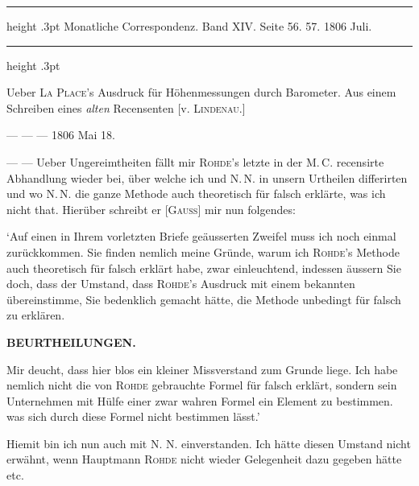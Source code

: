 \par\bigskip
{}
\hypertarget{native-490-lower}{}
\label{native-490-lower}
\begin{center}
\parbox{.70\linewidth}{%
\centering\small
\hrule height .3pt\relax\vspace{2.5pt}
Monatliche Correspondenz. Band XIV. Seite 56. 57. 1806 Juli.\par
\vspace{2.5pt}\hrule height .3pt\relax
}
\end{center}

\begin{center}
Ueber \textsc{La Place}'s Ausdruck für Höhenmessungen durch Barometer. Aus einem Schreiben eines \emph{alten} Recensenten [v. \textsc{Lindenau}.]
\end{center}

\begin{flushright}
--- --- --- 1806 Mai 18.
\end{flushright}

--- --- Ueber Ungereimtheiten fällt mir \textsc{Rohde}'s letzte in der M.\,C. recensirte Abhandlung wieder bei, über welche ich und N.\,N. in unsern Urtheilen differirten und wo N.\,N. die ganze Methode auch theoretisch für falsch erklärte, was ich nicht that. Hierüber schreibt er [\textsc{Gauss}] mir nun folgendes:

`Auf einen in Ihrem vorletzten Briefe geäusserten Zweifel muss ich noch einmal zurückkommen. Sie finden nemlich meine Gründe, warum ich \textsc{Rohde}'s Methode auch theoretisch für falsch erklärt habe, zwar einleuchtend, indessen äussern Sie doch, dass der Umstand, dass \textsc{Rohde}'s Ausdruck mit einem bekannten übereinstimme, Sie bedenklich gemacht hätte, die Methode unbedingt für falsch zu erklären.
\par
{}
\clearpage
\thispagestyle{empty}
\noindent{}%
%
\parbox[t]{\dimexpr\linewidth-24mm\relax}{\centering\footnotesize\bfseries BEURTHEILUNGEN.\par}%
\makebox[12mm][r]{}\par\nobreak\medskip
\noindent Mir deucht, dass hier blos ein kleiner Missverstand zum Grunde liege. Ich habe nemlich nicht die von \textsc{Rohde} gebrauchte Formel für falsch erklärt, sondern sein Unternehmen mit Hülfe einer zwar wahren Formel ein Element zu bestimmen. was sich durch diese Formel nicht bestimmen lässt.'

Hiemit bin ich nun auch mit N. N. einverstanden. Ich hätte diesen Umstand nicht erwähnt, wenn Hauptmann \textsc{Rohde} nicht wieder Gelegenheit dazu gegeben hätte etc.

